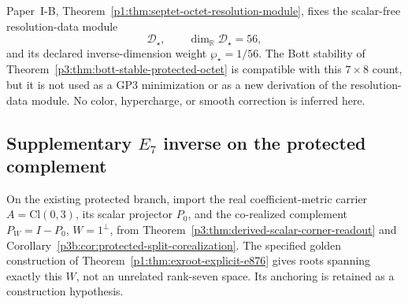 \documentclass[11pt,a4paper]{article}
\begin{document}
\begin{corollary}
\label{p3:cor:bott-stable-primitive-shell-carrier}
Paper~I-B, Theorem~\ref{p1:thm:septet-octet-resolution-module}, fixes the
scalar-free resolution-data module
\[
 \mathcal D_\star,
 \qquad
 \dim_{\mathbb R}\mathcal D_\star=56,
\]
and its declared inverse-dimension weight \(\wp_\star=1/56\).  The Bott
stability of Theorem~\ref{p3:thm:bott-stable-protected-octet} is compatible
with this \(7\times8\) count, but it is not used as a GP3 minimization or as a
new derivation of the resolution-data module.  No color, hypercharge, or
smooth correction is inferred here.
\end{corollary}



\subsection{Supplementary \texorpdfstring{\(E_7\)}{E7} inverse on the protected complement}
\label{p3b:app:exroot-protected-complement}

On the existing protected branch, import the real coefficient-metric
carrier \(A=\mathrm{Cl}(0,3)\), its scalar projector \(P_0\), and the
co-realized complement \(P_W=I-P_0\), \(W=1^\perp\), from
Theorem~\ref{p3:thm:derived-scalar-corner-readout} and
Corollary~\ref{p3b:cor:protected-split-corealization}.
The specified golden construction of
Theorem~\ref{p1:thm:exroot-explicit-e876} gives roots spanning exactly
this \(W\), not an unrelated rank-seven space.
Its anchoring is retained as a construction hypothesis.
\end{document}
